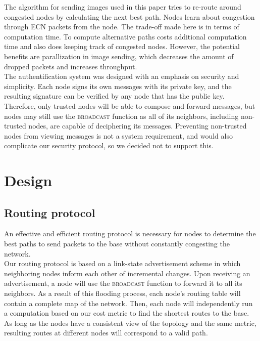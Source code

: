 \documentclass[letterpaper]{article}
\begin{document}
\noindent The algorithm for sending images used in this paper tries to re-route around congested nodes by calculating the next best path. Nodes learn about congestion through ECN packets from the node. The trade-off made here is in terms of computation time. To compute alternative paths costs additional computation time and also does keeping track of congested nodes. However, the potential benefits are parallization in image sending, which decreases the amount of dropped packets and increases throughput.
\\

\noindent The authentification system was designed with an emphasis on security and simplicity.
Each node signs its own messages with its private key, and the resulting signature can be verified by any
node that has the public key. Therefore, only trusted nodes will be able to compose and forward messages, but
nodes may still use the \textsc{broadcast} function as all of its neighbors, including non-trusted nodes, are
capable of deciphering its messages. Preventing non-trusted nodes from viewing messages is not a system 
requirement, and would also complicate our security protocol, so we decided not to support this.

\section{Design}

\subsection{Routing protocol}

An effective and efficient routing protocol is necessary for nodes to determine the best paths to send
packets to the base without constantly congesting the network.
\\

\noindent Our routing protocol is based on a link-state advertisement scheme in which neighboring nodes 
inform each other of incremental changes. Upon receiving an advertisement, a node will use the 
\textsc{broadcast} function to forward it to all its neighbors. As a result of this flooding process,
each node's routing table will contain a complete map of the network. Then, each node will independently
run a computation based on our cost metric to find the shortest routes to the base. As long as the nodes
have a consistent view of the topology and the same metric, resulting routes at different nodes will
correspond to a valid path.
\\
\end{document}
